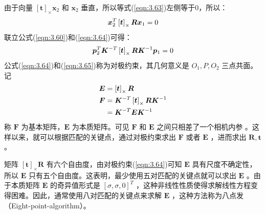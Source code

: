 由于向量 $\left[\boldsymbol{t}\right]_\times \boldsymbol{x}_{2} $ 和 $\bm{x}_2 $ 垂直，所以等式(\ref{eqn:3.63})左侧等于0，所以：
\begin{equation}
\label{eqn:3.64}
\setlength{\abovedisplayskip}{6pt}
\setlength{\belowdisplayskip}{6pt}
\boldsymbol{x}_{2}^{T} \left[\boldsymbol{t}\right]_\times \boldsymbol{R} \boldsymbol{x}_{1} = 0
\end{equation}
联立公式(\ref{eqn:3.60})和(\ref{eqn:3.64})可得：
\begin{equation}
\label{eqn:3.65}
\setlength{\abovedisplayskip}{6pt}
\setlength{\belowdisplayskip}{6pt}
\boldsymbol{p}_{2}^{T} \boldsymbol{K}^{-T} \left[\boldsymbol{t}\right]_\times \boldsymbol{R} \boldsymbol{K}^{-1} \boldsymbol{p}_{1}=0
\end{equation}
公式(\ref{eqn:3.64})和(\ref{eqn:3.65})称为对极约束，其几何意义是 $O_{1}, P, O_{2} $ 三点共面。记
\begin{equation}
\label{eqn:3.66}
\setlength{\abovedisplayskip}{6pt}
\setlength{\belowdisplayskip}{6pt}
\begin{aligned}
\boldsymbol{E} &= \left[\boldsymbol{t}\right]_\times \boldsymbol{R} \\
\boldsymbol{F} &= \boldsymbol{K}^{-T} \left[\boldsymbol{t}\right]_\times \boldsymbol{R} \boldsymbol{K}^{-1} \\
&= \boldsymbol{K}^{-T} \boldsymbol{E} \boldsymbol{K}^{-1} 
\end{aligned}
\end{equation}
称 $\boldsymbol{F} $ 为基本矩阵，$\boldsymbol{E} $ 为本质矩阵。可见 $\boldsymbol{F} $ 和 $\boldsymbol{E} $ 之间只相差了一个相机内参 。这样以来，就可以根据匹配的关键点，通过对极约束求出 $\boldsymbol{F} $ 或者 $\boldsymbol{E} $ ，进而求出 $\boldsymbol{R}, \boldsymbol{t} $ 。

矩阵 $\left[\boldsymbol{t}\right]_\times \boldsymbol{R}  $ 有六个自由度，由对极约束(\ref{eqn:3.64})可知 $\bm{E} $ 具有尺度不确定性，所以 $\bm{E} $ 只有五个自由度。这表明，最少使用五对匹配的关键点就可以求出 $\bm{E} $ 。由于本质矩阵 $\bm{E} $ 的奇异值形式是 $[\sigma, \sigma, 0]^{T} $ ，这种非线性性质使得求解线性方程变得困难。因此，通常使用八对匹配的关键点来求解 $\bm{E} $ ，这种方法称为八点发（Eight-point-algorithm）。

